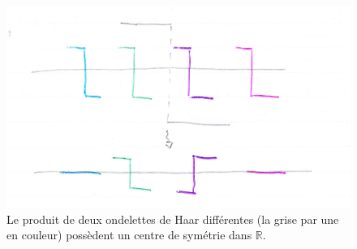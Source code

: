 \documentclass[]{article}
\theoremstyle{remark}
\theoremstyle{definition}
\begin{document}
	\begin{figure}[h]
		\centering
		\includegraphics[width=350pt]{Haar_exemple.png}
		\caption{Le produit de deux ondelettes de Haar différentes  (la grise par une en couleur) possèdent un centre de symétrie dans $\mathbb{R}$.}
	\end{figure}
	
\end{document}
